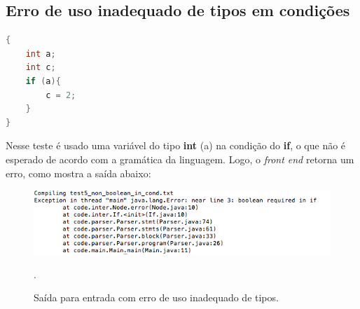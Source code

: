 \subsection{Erro de uso inadequado de tipos em condições}

\begin{lstlisting}[language=C, caption=Teste de uso inadequado de tipos em condições.]
{
    int a;
    int c;
    if (a){
        c = 2;
    }
}
\end{lstlisting}

Nesse teste é usado uma variável do tipo \textbf{int} (a) na condição do \textbf{if}, o que não é esperado de acordo com a gramática da linguagem. Logo, o \textit{front end} retorna um erro, como mostra a saída abaixo:

\begin{figure}[H]
    \includegraphics[width=1\textwidth]{imgs/test5.png}
    \caption{Saída para entrada com erro de uso inadequado de tipos.}.
    \label{fig:test5}
\end{figure}

